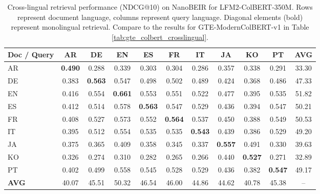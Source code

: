 \documentclass{article}
\begin{document}
\begin{table}[h]
\centering
\footnotesize
\setlength{\tabcolsep}{4pt}
\begin{tabular}{lccccccccc|c}
\toprule
\textbf{Doc / Query} & \textbf{AR} & \textbf{DE} & \textbf{EN} & \textbf{ES} & \textbf{FR} & \textbf{IT} & \textbf{JA} & \textbf{KO} & \textbf{PT} & \textbf{AVG} \\
\midrule
AR & \textbf{0.490} & 0.288 & 0.339 & 0.303 & 0.304 & 0.286 & 0.357 & 0.338 & 0.291 & 33.30 \\
DE & 0.383 & \textbf{0.563} & 0.547 & 0.498 & 0.502 & 0.489 & 0.424 & 0.368 & 0.486 & 47.33 \\
EN & 0.416 & 0.554 & \textbf{0.661} & 0.553 & 0.551 & 0.522 & 0.477 & 0.395 & 0.535 & 51.82 \\
ES & 0.412 & 0.514 & 0.578 & \textbf{0.563} & 0.547 & 0.529 & 0.436 & 0.394 & 0.547 & 50.21 \\
FR & 0.408 & 0.527 & 0.573 & 0.552 & \textbf{0.564} & 0.537 & 0.450 & 0.388 & 0.549 & 50.53 \\
IT & 0.395 & 0.512 & 0.554 & 0.535 & 0.535 & \textbf{0.543} & 0.439 & 0.386 & 0.529 & 49.20 \\
JA & 0.375 & 0.365 & 0.409 & 0.358 & 0.345 & 0.337 & \textbf{0.557} & 0.491 & 0.330 & 39.63 \\
KO & 0.326 & 0.274 & 0.310 & 0.282 & 0.265 & 0.266 & 0.440 & \textbf{0.527} & 0.271 & 32.89 \\
PT & 0.402 & 0.499 & 0.558 & 0.545 & 0.528 & 0.529 & 0.436 & 0.382 & \textbf{0.547} & 49.17 \\
\midrule
\textbf{AVG} & 40.07 & 45.51 & 50.32 & 46.54 & 46.00 & 44.86 & 44.62 & 40.78 & 45.38 & -- \\
\bottomrule
\end{tabular}
\caption{Cross-lingual retrieval performance (NDCG@10) on NanoBEIR for LFM2-ColBERT-350M. Rows represent document language, columns represent query language. Diagonal elements (bold) represent monolingual retrieval. Compare to the results for GTE-ModernColBERT-v1 in Table \ref{tab:gte_colbert_crosslingual}.}
\label{tab:colbert_crosslingual}
\end{table}
\end{document}

